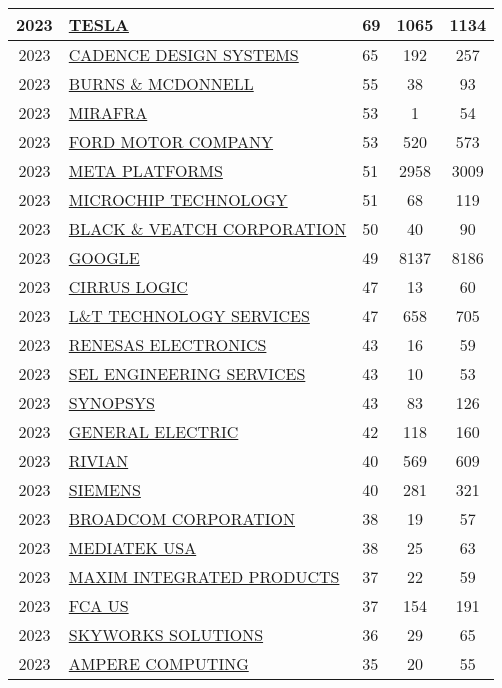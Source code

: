 \documentclass{article}%
\begin{document}
\begin{longtable}{c|p{20em}|p{5em}|c|c}
2023&\hyperref[subsec:TESLA]{TESLA}&69&1065&1134\\%
\hline%
2023&\hyperref[subsec:CADENCEDESIGNSYSTEMS]{CADENCE DESIGN SYSTEMS}&65&192&257\\%
\hline%
2023&\hyperref[subsec:BURNSMCDONNELL]{BURNS \& MCDONNELL}&55&38&93\\%
\hline%
2023&\hyperref[subsec:MIRAFRA]{MIRAFRA}&53&1&54\\%
\hline%
2023&\hyperref[subsec:FORDMOTORCOMPANY]{FORD MOTOR COMPANY}&53&520&573\\%
\hline%
2023&\hyperref[subsec:METAPLATFORMS]{META PLATFORMS}&51&2958&3009\\%
\hline%
2023&\hyperref[subsec:MICROCHIPTECHNOLOGY]{MICROCHIP TECHNOLOGY}&51&68&119\\%
\hline%
2023&\hyperref[subsec:BLACKVEATCHCORPORATION]{BLACK \& VEATCH CORPORATION}&50&40&90\\%
\hline%
2023&\hyperref[subsec:GOOGLE]{GOOGLE}&49&8137&8186\\%
\hline%
2023&\hyperref[subsec:CIRRUSLOGIC]{CIRRUS LOGIC}&47&13&60\\%
\hline%
2023&\hyperref[subsec:LTTECHNOLOGYSERVICES]{L\&T TECHNOLOGY SERVICES}&47&658&705\\%
\hline%
2023&\hyperref[subsec:RENESASELECTRONICS]{RENESAS ELECTRONICS}&43&16&59\\%
\hline%
2023&\hyperref[subsec:SELENGINEERINGSERVICES]{SEL ENGINEERING SERVICES}&43&10&53\\%
\hline%
2023&\hyperref[subsec:SYNOPSYS]{SYNOPSYS}&43&83&126\\%
\hline%
2023&\hyperref[subsec:GENERALELECTRIC]{GENERAL ELECTRIC}&42&118&160\\%
\hline%
2023&\hyperref[subsec:RIVIAN]{RIVIAN}&40&569&609\\%
\hline%
2023&\hyperref[subsec:SIEMENS]{SIEMENS}&40&281&321\\%
\hline%
2023&\hyperref[subsec:BROADCOMCORPORATION]{BROADCOM CORPORATION}&38&19&57\\%
\hline%
2023&\hyperref[subsec:MEDIATEKUSA]{MEDIATEK USA}&38&25&63\\%
\hline%
2023&\hyperref[subsec:MAXIMINTEGRATEDPRODUCTS]{MAXIM INTEGRATED PRODUCTS}&37&22&59\\%
\hline%
2023&\hyperref[subsec:FCAUS]{FCA US}&37&154&191\\%
\hline%
2023&\hyperref[subsec:SKYWORKSSOLUTIONS]{SKYWORKS SOLUTIONS}&36&29&65\\%
\hline%
2023&\hyperref[subsec:AMPERECOMPUTING]{AMPERE COMPUTING}&35&20&55\\%

\end{longtable}
\end{document}
